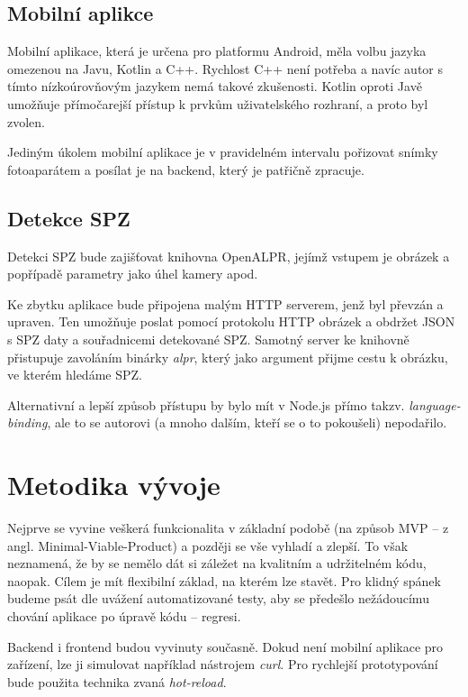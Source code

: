 \subsection{Mobilní aplikce} \label{mobile_app}

Mobilní aplikace, která je určena pro platformu Android, měla volbu jazyka omezenou na Javu, Kotlin a C++.
Rychlost C++ není potřeba a navíc autor s tímto nízkoúrovňovým jazykem nemá takové zkušenosti.
Kotlin oproti Javě umožňuje přímočarejší přístup k prvkům uživatelského rozhraní, a proto byl zvolen.

Jediným úkolem mobilní aplikace je v pravidelném intervalu pořizovat snímky fotoaparátem a posílat je na
backend, který je patřičně zpracuje.

\subsection{Detekce SPZ}

Detekci SPZ bude zajišťovat knihovna OpenALPR, jejímž vstupem je obrázek a popřípadě
parametry jako úhel kamery apod.
\citep[viz][]{OpenALPR}

Ke zbytku aplikace bude připojena malým HTTP serverem, jenž byl převzán a upraven.
Ten umožňuje poslat pomocí protokolu HTTP obrázek a obdržet JSON s SPZ daty a souřadnicemi detekované SPZ.
Samotný server ke knihovně přistupuje zavoláním binárky \textit{alpr}, který jako argument přijme cestu k
obrázku, ve kterém hledáme SPZ. \citep[viz][]{OpenALPR_Server}

Alternativní a lepší způsob přístupu by bylo mít v Node.js přímo takzv.
\textit{language-binding}, ale to se autorovi (a mnoho dalším, kteří se o to pokoušeli) nepodařilo.

\section{Metodika vývoje}

Nejprve se vyvine veškerá funkcionalita v základní podobě
(na způsob MVP -- z angl. Minimal-Viable-Product) a později se vše vyhladí a zlepší. To však neznamená,
že by se nemělo dát si záležet na kvalitním a udržitelném kódu, naopak. Cílem je mít flexibilní základ,
na kterém lze stavět. Pro klidný spánek budeme psát dle uvážení automatizované testy, aby se předešlo
nežádoucímu chování aplikace po úpravě kódu -- regresi.

Backend i frontend budou vyvinuty současně. Dokud není mobilní aplikace pro zařízení, lze ji simulovat
například nástrojem \textit{curl}. Pro rychlejší prototypování bude použita technika zvaná
\textit{hot-reload}.
